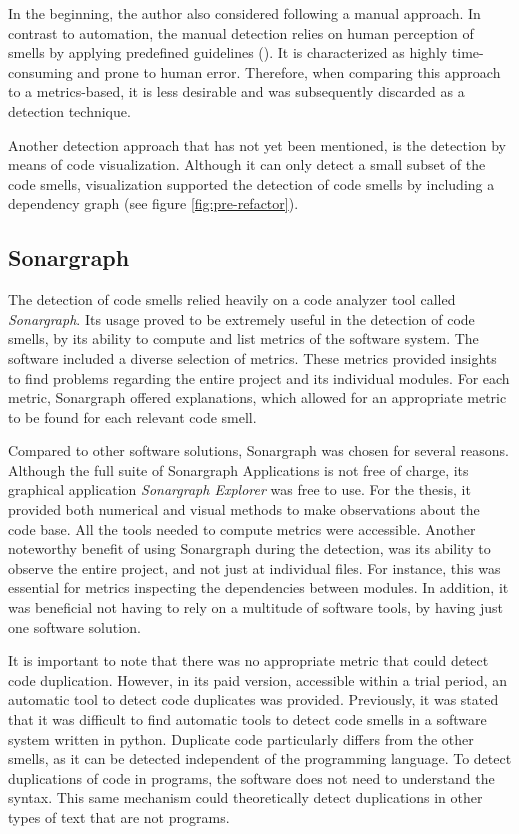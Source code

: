 In the beginning, the author also considered following a manual approach. In contrast to automation, the manual detection relies on human perception of smells by applying predefined guidelines (\cite{menshawy2021}). It is characterized as highly time-consuming and prone to human error. Therefore, when comparing this approach to a metrics-based, it is less desirable and was subsequently discarded as a detection technique.

Another detection approach that has not yet been mentioned, is the detection by means of code visualization. Although it can only detect a small subset of the code smells, visualization supported the detection of code smells by including a dependency graph (see figure \ref{fig:pre-refactor}).

\subsection{Sonargraph}
The detection of code smells relied heavily on a code analyzer tool called \emph{Sonargraph}. Its usage proved to be extremely useful in the detection of code smells, by its ability to compute and list metrics of the software system. The software included a diverse selection of metrics. These metrics provided insights to find problems regarding the entire project and its individual modules. For each metric, Sonargraph offered explanations, which allowed for an appropriate metric to be found for each relevant code smell.

Compared to other software solutions, Sonargraph was chosen for several reasons. Although the full suite of Sonargraph Applications is not free of charge, its graphical application \emph{Sonargraph Explorer} was free to use. For the thesis, it provided both numerical and visual methods to make observations about the code base. All the tools needed to compute metrics were accessible. Another noteworthy benefit of using Sonargraph during the detection, was its ability to observe the entire project,  and not just at individual files. For instance, this was essential for metrics inspecting the dependencies between modules. In addition, it was beneficial not having to rely on a multitude of software tools, by having just one software solution.

It is important to note that there was no appropriate metric that could detect code duplication. However, in its paid version, accessible within a trial period, an automatic tool to detect code duplicates was provided.  Previously, it was stated that it was difficult to find automatic tools to detect code smells in a software system written in python. Duplicate code particularly differs from the other smells, as it can be detected independent of the programming language. To detect duplications of code in programs, the software does not need to understand the syntax. This same mechanism could theoretically detect duplications in other types of text that are not programs. 

